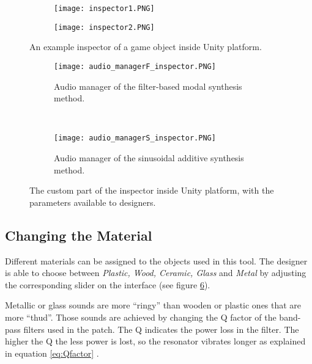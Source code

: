 \begin{figure}[H]
    \centering
    \begin{subfigure}[b]{0.45\textwidth}
        \texttt{[image: inspector1.PNG]}
        \label{fig:FB}
    \end{subfigure}
    \vspace{-0.6cm}%
      
\hspace{-4pt}\begin{subfigure}[b]{0.45\textwidth}
        \texttt{[image: inspector2.PNG]}
        \label{fig:sin}
    \end{subfigure}
    \caption{An example inspector of a game object inside Unity\textsuperscript{\textregistered} platform.}\label{fig:audio_insp}
\end{figure}


\begin{figure}[H]
    \centering
    \begin{subfigure}[b]{0.45\textwidth}
        \texttt{[image: audio\_managerF\_inspector.PNG]}
        \caption{Audio manager of the filter-based modal synthesis method.}
        \label{fig:FB}
    \end{subfigure}
    ~ %
    \begin{subfigure}[b]{0.45\textwidth}
        \texttt{[image: audio\_managerS\_inspector.PNG]}
        \caption{Audio manager of the sinusoidal additive synthesis method.}
        \label{fig:sin}
    \end{subfigure}
    \caption{The custom part of the inspector inside Unity\textsuperscript{\textregistered} platform, with the parameters available to designers.}\label{fig:custom_insp}
\end{figure}

\subsection{Changing the Material}
Different materials can be assigned to the objects used in this tool. The designer is able to choose between \textit{Plastic, Wood, Ceramic, Glass} and \textit{Metal} by adjusting the corresponding slider on the interface (see figure \ref{fig:custom_insp}). 

Metallic or glass sounds are more ``ringy'' than wooden or plastic ones that are more ``thud''. Those sounds are achieved by changing the \gls{Q} factor of the band-pass filters used in the  patch. The \gls{Q} indicates the power loss in the filter. The higher the \gls{Q} the less power is lost, so the resonator vibrates longer as explained in equation \ref{eq:Qfactor} \cite{bib:Q}.

